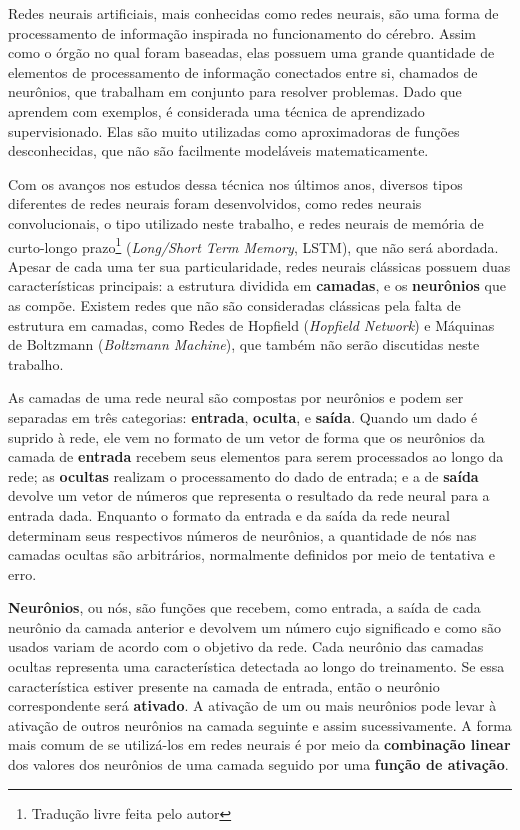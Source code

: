
Redes neurais artificiais, mais conhecidas como redes neurais, são uma forma de processamento de informação inspirada no funcionamento do cérebro.
Assim como o órgão no qual foram baseadas, elas possuem uma grande quantidade de elementos de processamento de informação conectados entre si, chamados de neurônios, que trabalham em conjunto para resolver problemas.
Dado que aprendem com exemplos, é considerada uma técnica de aprendizado supervisionado.
Elas são muito utilizadas como aproximadoras de funções desconhecidas, que não são facilmente modeláveis matematicamente.

Com os avanços nos estudos dessa técnica nos últimos anos, diversos tipos diferentes de redes neurais foram desenvolvidos, como redes neurais convolucionais, o tipo utilizado neste trabalho, e redes neurais de memória de curto-longo prazo\footnote{Tradução livre feita pelo autor} (\textit{Long/Short Term Memory}, LSTM), que não será abordada.
Apesar de cada uma ter sua particularidade, redes neurais clássicas possuem duas características principais: a estrutura dividida em \textbf{camadas}, e os \textbf{neurônios} que as compõe.
Existem redes que não são consideradas clássicas pela falta de estrutura em camadas, como Redes de Hopfield (\textit{Hopfield Network}) e Máquinas de Boltzmann (\textit{Boltzmann Machine}), que também não serão discutidas neste trabalho.

As camadas de uma rede neural são compostas por neurônios e podem ser separadas em três categorias: \textbf{entrada}, \textbf{oculta}, e \textbf{saída}.
Quando um dado é suprido à rede, ele vem no formato de um vetor de forma que os neurônios da camada de \textbf{entrada} recebem seus elementos para serem processados ao longo da rede;
as \textbf{ocultas} realizam o processamento do dado de entrada;
e a de \textbf{saída} devolve um vetor de números que representa o resultado da rede neural para a entrada dada.
Enquanto o formato da entrada e da saída da rede neural determinam seus respectivos números de neurônios, a quantidade de nós nas camadas ocultas são arbitrários, normalmente definidos por meio de tentativa e erro.

\textbf{Neurônios}, ou nós, são funções que recebem, como entrada, a saída de cada neurônio da camada anterior e devolvem um número
cujo significado e como são usados variam de acordo com o objetivo da rede.
Cada neurônio das camadas ocultas representa uma característica detectada ao longo do treinamento.
Se essa característica estiver presente na camada de entrada, então o neurônio correspondente será \textbf{ativado}.
A ativação de um ou mais neurônios pode levar à ativação de outros neurônios na camada seguinte e assim sucessivamente.
A forma mais comum de se utilizá-los em redes neurais é por meio da \textbf{combinação linear} dos valores dos neurônios de uma camada seguido por uma \textbf{função de ativação}.

